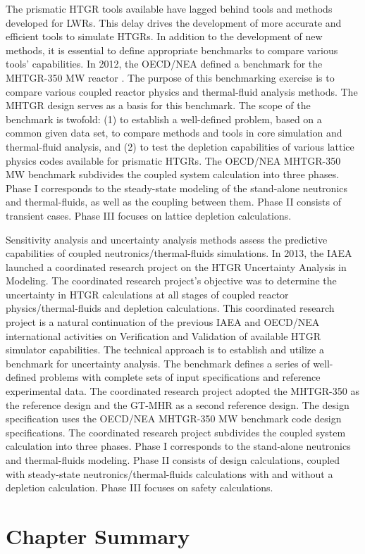 The prismatic HTGR tools available have lagged behind tools and methods developed for \glspl{LWR}.
This delay drives the development of more accurate and efficient tools to simulate HTGRs.
In addition to the development of new methods, it is essential to define appropriate benchmarks to compare various tools' capabilities.
In 2012, the \gls{OECD}/\gls{NEA} defined a benchmark for the \gls{MHTGR}-350 MW reactor \cite{oecd_nea_benchmark_2017}.
The purpose of this benchmarking exercise is to compare various coupled reactor physics and thermal-fluid analysis methods.
The MHTGR design serves as a basis for this benchmark.
The scope of the benchmark is twofold: (1) to establish a well-defined problem, based on a common given data set, to compare methods and tools in core simulation and thermal-fluid analysis, and (2) to test the depletion capabilities of various lattice physics codes available for prismatic \glspl{HTGR}.
The OECD/NEA MHTGR-350 MW benchmark subdivides the coupled system calculation into three phases.
Phase I corresponds to the steady-state modeling of the stand-alone neutronics and thermal-fluids, as well as the coupling between them.
Phase II consists of transient cases.
Phase III focuses on lattice depletion calculations.

Sensitivity analysis and uncertainty analysis methods assess the predictive capabilities of coupled neutronics/thermal-fluids simulations.
In 2013, the IAEA launched a coordinated research project \cite{tyobeka_htgr_2011} on the HTGR Uncertainty Analysis in Modeling.
The coordinated research project's objective was to determine the uncertainty in HTGR calculations at all stages of coupled reactor physics/thermal-fluids and depletion calculations.
This coordinated research project is a natural continuation of the previous IAEA and OECD/NEA international activities \cite{iaea_evaluation_2003}\cite{reitsma_oecd-neansc_2008} on Verification and Validation of available HTGR simulator capabilities.
The technical approach is to establish and utilize a benchmark for uncertainty analysis.
The benchmark defines a series of well-defined problems with complete sets of input specifications and reference experimental data.
The coordinated research project adopted the MHTGR-350 as the reference design and the GT-MHR as a second reference design.
The design specification uses the OECD/NEA MHTGR-350 MW benchmark \cite{oecd_nea_benchmark_2017} code design specifications.
The coordinated research project subdivides the coupled system calculation into three phases.
Phase I corresponds to the stand-alone neutronics and thermal-fluids modeling.
Phase II consists of design calculations, coupled with steady-state neutronics/thermal-fluids calculations with and without a depletion calculation.
Phase III focuses on safety calculations.

\section{Chapter Summary}
\label{sec:litreview-summary}

